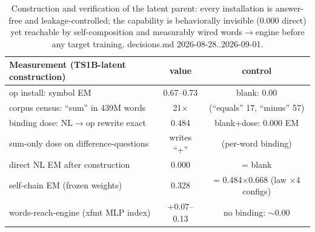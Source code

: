 \begin{table}[t]
\centering
\begin{tabular}{lcc}
\hline
Measurement (TS1B-latent construction) & value & control \\
\hline
op install: symbol EM & 0.67--0.73 & blank: 0.00 \\
corpus census: ``sum'' in 439M words & 21$\times$ & (``equals'' 17, ``minus'' 57) \\
binding dose: NL$\to$op rewrite exact & 0.484 & blank+dose: 0.000 EM \\
sum-only dose on difference-questions & writes ``+'' & (per-word binding) \\
direct NL EM after construction & 0.000 & = blank \\
self-chain EM (frozen weights) & 0.328 & = 0.484$\times$0.668 (law $\times$4 configs) \\
words-reach-engine (xfmt MLP index) & +0.07--0.13 & no binding: $\sim$0.00 \\
\hline
\end{tabular}
\caption{Construction and verification of the latent parent: every installation is answer-free and leakage-controlled; the capability is behaviorally invisible (0.000 direct) yet reachable by self-composition and measurably wired words$\to$engine before any target training. decisions.md 2026-08-28..2026-09-01.}
\label{tab:premise_program}
\end{table}
